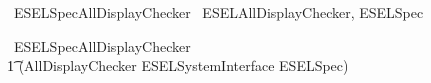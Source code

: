 \begin{zsection}
	\SECTION\ ESELSpecAllDisplayChecker \parents\ ESELAllDisplayChecker, ESELSpec
\end{zsection}

\begin{circus}
    \circprocess\ ESELSpecAllDisplayChecker \circdef \\
        \t1 (AllDisplayChecker \lpar ESELSystemInterface \rpar ESELSpec) \\
\end{circus}
